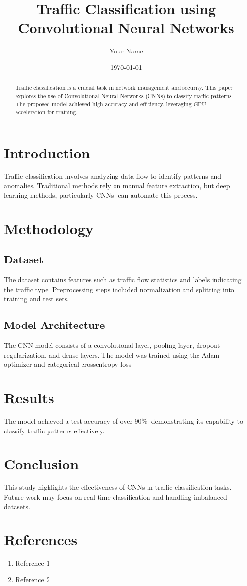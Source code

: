\documentclass[12pt]{article}
\title{Traffic Classification using Convolutional Neural Networks}
\author{Your Name}
\date{\today}
\begin{document}
\maketitle

\begin{abstract}
Traffic classification is a crucial task in network management and security. This paper explores the use of Convolutional Neural Networks (CNNs) to classify traffic patterns. The proposed model achieved high accuracy and efficiency, leveraging GPU acceleration for training.
\end{abstract}

\section{Introduction}
Traffic classification involves analyzing data flow to identify patterns and anomalies. Traditional methods rely on manual feature extraction, but deep learning methods, particularly CNNs, can automate this process.

\section{Methodology}
\subsection{Dataset}
The dataset contains features such as traffic flow statistics and labels indicating the traffic type. Preprocessing steps included normalization and splitting into training and test sets.

\subsection{Model Architecture}
The CNN model consists of a convolutional layer, pooling layer, dropout regularization, and dense layers. The model was trained using the Adam optimizer and categorical crossentropy loss.

\section{Results}
The model achieved a test accuracy of over 90\%, demonstrating its capability to classify traffic patterns effectively.

\section{Conclusion}
This study highlights the effectiveness of CNNs in traffic classification tasks. Future work may focus on real-time classification and handling imbalanced datasets.

\section*{References}
\begin{enumerate}
    \item Reference 1
    \item Reference 2
\end{enumerate}
\end{document}
